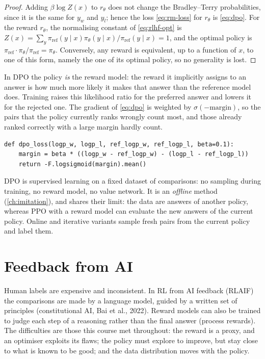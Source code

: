 \begin{proof}
  Adding $\beta \log Z(x)$ to $r_\theta$ does not change the
  Bradley--Terry probabilities, since it is the same for $y_w$ and $y_l$;
  hence the loss \eqref{eq:rm-loss} for $r_\theta$ is \eqref{eq:dpo}. For
  the reward $r_\theta$, the normalising constant of \eqref{eq:rlhf-opt} is
  $Z(x) = \sum_y \pi_{\mathrm{ref}}(y \mid x) \pi_\theta(y \mid x) /
  \pi_{\mathrm{ref}}(y \mid x) = 1$, and the optimal policy is
  $\pi_{\mathrm{ref}} \cdot \pi_\theta / \pi_{\mathrm{ref}} = \pi_\theta$.
  Conversely, any reward is equivalent, up to a function of $x$, to one of
  this form, namely the one of its optimal policy, so no generality is
  lost.
\end{proof}

\begin{intuition}
  In DPO the policy \emph{is} the reward model: the reward it implicitly
  assigns to an answer is how much more likely it makes that answer than
  the reference model does. Training raises this likelihood ratio for the
  preferred answer and lowers it for the rejected one. The gradient of
  \eqref{eq:dpo} is weighted by $\sigma(-\text{margin})$, so the pairs that
  the policy currently ranks wrongly count most, and those already ranked
  correctly with a large margin hardly count.
\end{intuition}

\begin{lstlisting}[caption={DPO loss (PyTorch); \code{logp} are summed token
  log-probabilities of the answers}]
def dpo_loss(logp_w, logp_l, ref_logp_w, ref_logp_l, beta=0.1):
    margin = beta * ((logp_w - ref_logp_w) - (logp_l - ref_logp_l))
    return -F.logsigmoid(margin).mean()
\end{lstlisting}

DPO is supervised learning on a fixed dataset of comparisons: no sampling
during training, no reward model, no value network. It is an
\emph{offline} method (\cref{ch:imitation}), and shares their limit: the
data are answers of another policy, whereas PPO with a reward model can
evaluate the new answers of the current policy. Online and iterative
variants sample fresh pairs from the current policy and label them.

\section{Feedback from AI}

Human labels are expensive and inconsistent. In RL from AI feedback
(RLAIF) the comparisons are made by a language model, guided by a written
set of principles (constitutional AI, Bai et al., 2022). Reward models can
also be trained to judge each step of a reasoning rather than the final
answer (process rewards). The difficulties are those this course met
throughout: the reward is a proxy, and an optimiser exploits its flaws;
the policy must explore to improve, but stay close to what is known to be
good; and the data distribution moves with the policy.

